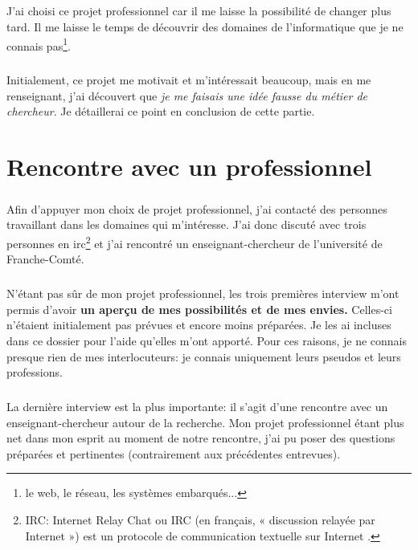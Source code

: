 \documentclass[a4paper,12pt, draft]{report}
\begin{document}
\paragraph{}
J'ai choisi ce projet professionnel car il me laisse la possibilité de changer plus tard. Il me laisse le temps de découvrir des domaines de l'informatique que je ne connais pas\footnote{le web, le réseau, les systèmes embarqués...}. 

\paragraph{}
Initialement, ce projet me motivait et m'intéressait beaucoup, mais en me renseignant, j'ai découvert que \textit{je me faisais une idée fausse du métier de chercheur}. Je détaillerai ce point en conclusion de cette partie.



\chapter{Rencontre avec un professionnel}
\paragraph{}
Afin d'appuyer mon choix de projet professionnel, j'ai contacté des personnes travaillant dans les domaines qui m'intéresse.
J'ai donc discuté avec trois personnes en irc\footnote{\textsc{IRC}: Internet Relay Chat ou IRC (en français, « discussion relayée par Internet ») est un protocole de communication textuelle sur Internet .} et j'ai rencontré un enseignant-chercheur de l'université de Franche-Comté.

\paragraph{}
N'étant pas sûr de mon projet professionnel, les trois premières interview m'ont permis d'avoir \textbf{un aperçu de mes possibilités et de mes envies.} Celles-ci n'étaient initialement pas prévues et encore moins préparées. Je les ai incluses dans ce dossier pour l'aide qu'elles m'ont apporté.
Pour ces raisons, je ne connais presque rien de mes interlocuteurs: je connais uniquement leurs pseudos et leurs professions.

\paragraph{}
La dernière interview est la plus importante: il s'agit d'une rencontre avec un enseignant-chercheur autour de la recherche. Mon projet professionnel étant plus net dans mon esprit au moment de notre rencontre, j'ai pu poser des questions préparées et pertinentes (contrairement aux précédentes entrevues).
\end{document}
